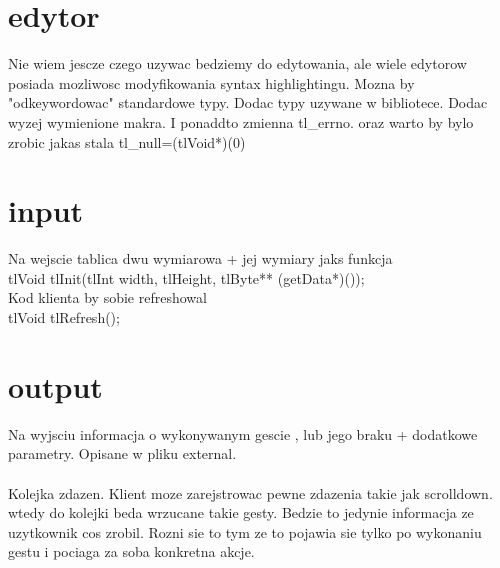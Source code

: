 \documentclass[10pt,a4paper]{article}
\begin{document}
\section{edytor}
Nie wiem jescze czego uzywac bedziemy do edytowania, ale wiele edytorow posiada mozliwosc modyfikowania syntax highlightingu. Mozna by "odkeywordowac" standardowe typy. Dodac typy uzywane w bibliotece. Dodac wyzej wymienione makra.
I ponaddto zmienna tl_errno. oraz warto by bylo zrobic jakas stala tl_null=(tlVoid*)(0)


\section{input}

Na wejscie tablica dwu wymiarowa + jej wymiary
jaks funkcja\\
tlVoid tlInit(tlInt width, tlHeight, tlByte** (getData*)());\\
Kod klienta by sobie refreshowal\\
tlVoid tlRefresh();

\section{output}

Na wyjsciu informacja o wykonywanym gescie , lub jego braku + dodatkowe parametry. Opisane w pliku external. \\\\

Kolejka zdazen. Klient moze zarejstrowac pewne zdazenia takie jak scrolldown. wtedy do kolejki beda wrzucane takie gesty. Bedzie to jedynie informacja ze uzytkownik cos zrobil. Rozni sie to tym ze to pojawia sie tylko po wykonaniu gestu i pociaga za soba konkretna akcje.
\end{document}
